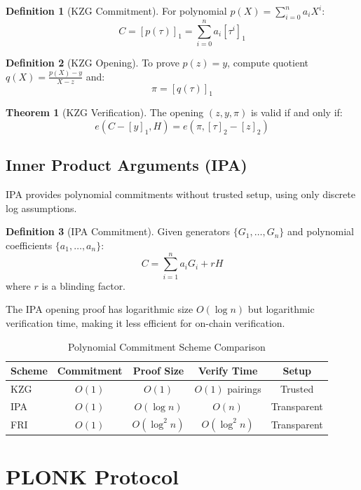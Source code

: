 \documentclass[11pt,a4paper]{article}
\theoremstyle{definition}
\newtheorem{definition}{Definition}
\newtheorem{theorem}{Theorem}
\begin{document}
\begin{definition}[KZG Commitment]
    For polynomial $p(X) = \sum_{i=0}^{n} a_i X^i$:
    \[
    C = [p(\tau)]_1 = \sum_{i=0}^{n} a_i [\tau^i]_1
    \]
\end{definition}

\begin{definition}[KZG Opening]
    To prove $p(z) = y$, compute quotient $q(X) = \frac{p(X) - y}{X - z}$ and:
    \[
    \pi = [q(\tau)]_1
    \]
\end{definition}

\begin{theorem}[KZG Verification]
    The opening $(z, y, \pi)$ is valid if and only if:
    \[
    e(C - [y]_1, H) = e(\pi, [\tau]_2 - [z]_2)
    \]
\end{theorem}

\subsection{Inner Product Arguments (IPA)}

IPA provides polynomial commitments without trusted setup, using only discrete log assumptions.

\begin{definition}[IPA Commitment]
    Given generators $\{G_1, \ldots, G_n\}$ and polynomial coefficients $\{a_1, \ldots, a_n\}$:
    \[
    C = \sum_{i=1}^{n} a_i G_i + r H
    \]
    where $r$ is a blinding factor.
\end{definition}

The IPA opening proof has logarithmic size $O(\log n)$ but logarithmic verification time, making it less efficient for on-chain verification.

\begin{table}[h]
\centering
\caption{Polynomial Commitment Scheme Comparison}
\begin{tabular}{lcccc}
\toprule
Scheme & Commitment & Proof Size & Verify Time & Setup \\
\midrule
KZG & $O(1)$ & $O(1)$ & $O(1)$ pairings & Trusted \\
IPA & $O(1)$ & $O(\log n)$ & $O(n)$ & Transparent \\
FRI & $O(1)$ & $O(\log^2 n)$ & $O(\log^2 n)$ & Transparent \\
\bottomrule
\end{tabular}
\end{table}

\section{PLONK Protocol}
\end{document}
